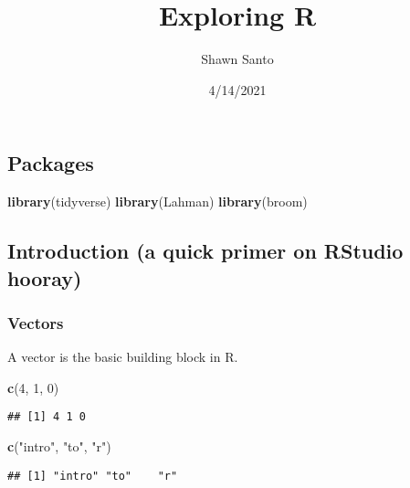 \documentclass[
]{article}
\title{Exploring R}
\author{Shawn Santo}
\date{4/14/2021}
\newenvironment{Shaded}{\begin{snugshade}}{\end{snugshade}}
\newcommand{\DecValTok}[1]{\textcolor[rgb]{0.00,0.00,0.81}{#1}}
\newcommand{\KeywordTok}[1]{\textcolor[rgb]{0.13,0.29,0.53}{\textbf{#1}}}
\newcommand{\NormalTok}[1]{#1}
\newcommand{\StringTok}[1]{\textcolor[rgb]{0.31,0.60,0.02}{#1}}
\begin{document}
\maketitle

\hypertarget{packages}{%
\subsection{Packages}\label{packages}}

\begin{Shaded}
\begin{Highlighting}[]
\KeywordTok{library}\NormalTok{(tidyverse)}
\KeywordTok{library}\NormalTok{(Lahman)}
\KeywordTok{library}\NormalTok{(broom)}
\end{Highlighting}
\end{Shaded}

\hypertarget{introduction-a-quick-primer-on-rstudio-hooray}{%
\subsection{Introduction (a quick primer on RStudio
hooray)}\label{introduction-a-quick-primer-on-rstudio-hooray}}

\hypertarget{vectors}{%
\subsubsection{Vectors}\label{vectors}}

A vector is the basic building block in R.

\begin{Shaded}
\begin{Highlighting}[]
\KeywordTok{c}\NormalTok{(}\DecValTok{4}\NormalTok{, }\DecValTok{1}\NormalTok{, }\DecValTok{0}\NormalTok{)}
\end{Highlighting}
\end{Shaded}

\begin{verbatim}
## [1] 4 1 0
\end{verbatim}

\begin{Shaded}
\begin{Highlighting}[]
\KeywordTok{c}\NormalTok{(}\StringTok{"intro"}\NormalTok{, }\StringTok{"to"}\NormalTok{, }\StringTok{"r"}\NormalTok{)}
\end{Highlighting}
\end{Shaded}

\begin{verbatim}
## [1] "intro" "to"    "r"
\end{verbatim}
\end{document}
